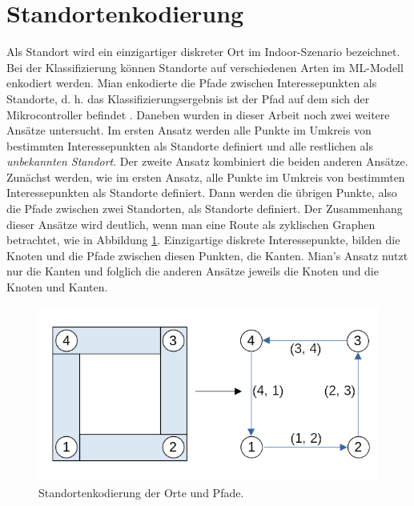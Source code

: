 \section{Standortenkodierung}
\label{sec:model_location_encoding}
Als Standort wird ein einzigartiger diskreter Ort im Indoor-Szenario bezeichnet.
Bei der Klassifizierung können Standorte auf verschiedenen Arten im ML-Modell enkodiert werden.
Mian enkodierte die Pfade zwischen Interessepunkten als Standorte,
d. h. das Klassifizierungsergebnis ist der Pfad auf dem sich der Mikrocontroller befindet \cite{naveedThesis}.
\newline
\newline
Daneben wurden in dieser Arbeit noch zwei weitere Ansätze untersucht.
Im ersten Ansatz werden alle Punkte im Umkreis von bestimmten Interessepunkten als Standorte definiert und alle restlichen als \textit{unbekannten Standort}.
Der zweite Ansatz kombiniert die beiden anderen Ansätze.
Zunächst werden, wie im ersten Ansatz, alle Punkte im Umkreis von bestimmten Interessepunkten als Standorte definiert.
Dann werden die übrigen Punkte, also die Pfade zwischen zwei Standorten, als Standorte definiert.
\newline
\newline
Der Zusammenhang dieser Ansätze wird deutlich, wenn man eine Route als zyklischen Graphen betrachtet, wie in Abbildung \ref{fig:location_encoding}.
Einzigartige diskrete Interessepunkte, bilden die Knoten und die Pfade zwischen diesen Punkten, die Kanten.
Mian's Ansatz nutzt nur die Kanten und folglich die anderen Ansätze jeweils die Knoten und die Knoten und Kanten.
\begin{figure}[h!]
    \centering
    \includegraphics[width=\linewidth]{images/location_encoding.png}
    \caption{Standortenkodierung der Orte und Pfade.}
    \label{fig:location_encoding}
\end{figure}
\newline
